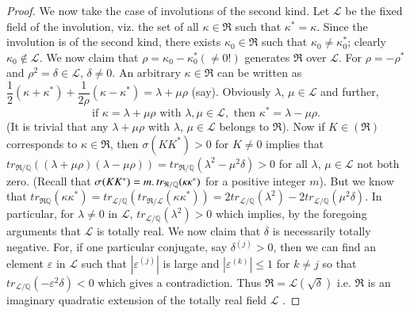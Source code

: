\begin{proof}
We now take the case of involutions of the second kind. Let
$\mathscr{L}$ be the fixed field of the involution, viz. the set of
all $\kappa \in \mathfrak{R}$ such that $\kappa^{\ast} =
\kappa$. Since the involution is of the second kind, there exists
$\kappa_0 \in \mathfrak{R}$ such that $\kappa_0 \neq \kappa^{\ast}_0$;
clearly $\kappa_0 \not\in \mathscr{L}$. We now claim that
$\rho = \kappa_0 - \kappa^{\ast}_0(\neq 0 !)$ generates $\mathfrak{R}$
over $\mathscr{L}$. For $\rho=-\rho^{\ast}$ and $\rho^2 = \delta
\in\mathscr{L}$, $\delta \neq 0$. An arbitrary $\kappa \in
\mathfrak{R}$ can be written as $\dfrac{1}{2}(\kappa + \kappa^{\ast})
+ \dfrac{1}{2\rho}(\kappa-\kappa^{\ast}) = \lambda+\mu \rho$
(say). Obviously $\lambda$, $\mu \in \mathscr{L}$ and further, 
\begin{equation*}
\text{if } \kappa = \lambda + \mu \rho \text{ with } \lambda, \mu \in
\mathscr{L}, \text{ then } \kappa^{\ast} = \lambda - \mu
\rho. \tag{18}\label{eq18} 
\end{equation*}\pageoriginale
(It is trivial that any $\lambda + \mu \rho$ with $\lambda$, $\mu \in
\mathscr{L}$ belongs to $\mathfrak{R}$). Now if $K \in (\mathfrak{R})$
corresponds to $\kappa \in \mathfrak{R}$, then $\sigma(K K^{\ast})>0$
for $K\neq 0$ implies that $tr_{\mathfrak{R}/\mathbb{Q}}((\lambda+\mu
\rho)(\lambda-\mu \rho)) = tr_{\mathfrak{R}/\mathbb{Q}} (\lambda^2 -
\mu^2 \delta)>0$ for all $\lambda$, $\mu \in \mathscr{L}$ not both
zero. (Recall that $\sigma(KK^{\ast}) = m\ldotp
tr_{\mathfrak{R}/\mathbb{Q}} (\kappa\kappa^{\ast})$ for a positive
integer $m$). But we know that
$tr_{\mathfrak{R}\mathbb{Q}}(\kappa\kappa^{\ast}) =
tr_{\mathscr{L}/\mathbb{Q}} (tr_{\mathfrak{R}/\mathscr{L}} (\kappa
\kappa^{\ast})) = 2 tr_{\mathscr{L}/\mathbb{Q}} (\lambda^2)-2
tr_{\mathscr{L}/\mathbb{Q}} (\mu^2 \delta)$. In particular, for
$\lambda \neq 0$ in $\mathscr{L}$,
$tr_{\mathscr{L}/\mathbb{Q}}(\lambda^2)>0$ which implies, by the
foregoing arguments that $\mathscr{L}$ is totally real. We now claim
that $\delta$ is necessarily totally negative. For, if one particular
conjugate, say $\delta^{(j)}>0$, then we can find an element
$\varepsilon$ in $\mathscr{L}$ such that $|\varepsilon^{(j)}|$ is
large and $|\varepsilon^{(k)}|\leq 1$ for $k\neq j$ so that
$tr_{\mathscr{L}/\mathbb{Q}} (-\varepsilon^2\delta)<0$ which gives a
contradiction. Thus $\mathfrak{R} = \mathscr{L}(\sqrt{\delta})$
i.e. $\mathfrak{R}$ is an imaginary quadratic extension of the totally
real field $\mathscr{L}$  .
 \end{proof}

